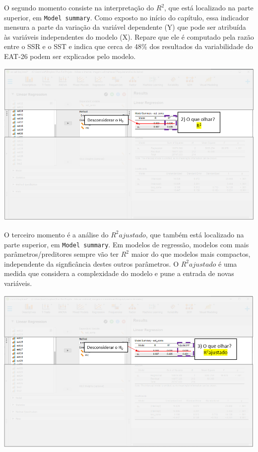 \documentclass[
]{book}
\begin{document}
O segundo momento consiste na interpretação do \(R^2\), que está
localizado na parte superior, em \texttt{Model\ summary}. Como exposto
no início do capítulo, essa indicador mensura a parte da variação da
variável dependente (Y) que pode ser atribuída às variáveis
independentes do modelo (X). Repare que ele é computado pela razão entre
o SSR e o SST e indica que cerca de 48\% dos resultados da variabilidade
do EAT-26 podem ser explicados pelo modelo.

\includegraphics{./img/cap_reg_multipla_resultado_2.png}

O terceiro momento é a análise do \(R^2 ajustado\), que também está
localizado na parte superior, em \texttt{Model\ summary}. Em modelos de
regressão, modelos com mais parâmetros/preditores sempre vão ter \(R^2\)
maior do que modelos mais compactos, independente da signficância destes
outros parâmetros. O \(R^2 ajustado\) é uma medida que considera a
complexidade do modelo e pune a entrada de novas variáveis.

\includegraphics{./img/cap_reg_multipla_resultado_3.png}
\end{document}

